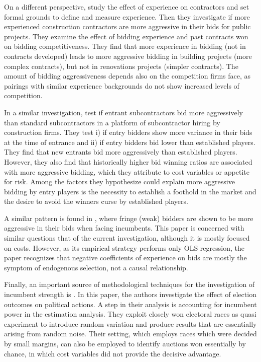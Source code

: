 On a different perspective, \citep{fu2002effect} study the effect of experience on contractors and set formal grounds to define and measure experience. Then they investigate if more experienced construction contractors are more aggressive in their bids for public projects. They examine the effect of bidding experience and past contracts won on bidding competitiveness. They find that more experience in bidding (not in contracts developed) leads to more aggressive bidding in building projects (more complex contracts), but not in renovations projects (simpler contracts). The amount of bidding aggressiveness depends also on the competition firms face, as pairings with similar experience backgrounds do not show increased levels of competition.

In a similar investigation, \citep{li2012construction} test if entrant subcontractors bid more aggressively than standard subcontractors in a platform of subcontractor hiring by construction firms. They test i) if entry bidders show more variance in their bids at the time of entrance and ii) if entry bidders bid lower than established players. They find that new entrants bid more aggressively than established players. However, they also find that historically higher bid winning ratios are associated with more aggressive bidding, which they attribute to cost variables or appetite for risk. Among the factors they hypothesize could explain more aggressive bidding by entry players is the necessity to establish a foothold in the market and the desire to avoid the winners curse by established players.

A similar pattern is found in \citep{estache2010bidder}, where fringe (weak) bidders are shown to be more aggressive in their bids when facing incumbents. This paper is concerned with similar questions that of the current investigation, although it is mostly focused on costs. However, as its empirical strategy performs only OLS regression, the paper recognizes that negative coefficients of experience on bids are mostly the symptom of endogenous selection, not a causal relationship.

Finally, an important source of methodological techniques for the investigation of incumbent strength is \citep{lee2004voters}. In this paper, the authors investigate the effect of election outcomes on political actions. A step in their analysis is accounting for incumbent power in the estimation analysis. They exploit closely won electoral races as quasi experiment to introduce random variation and produce results that are essentially arising from random noise. Their setting, which employs races which were decided by small margins, can also be employed to identify auctions won essentially by chance, in which cost variables did not provide the decisive advantage.
